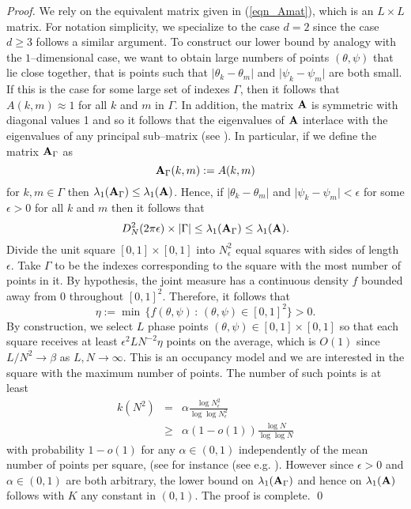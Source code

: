 \documentclass[smallextended]{svjour3}
\begin{document}
\begin{proof}
We rely on the equivalent matrix given in (\ref{eqn_Amat}), which is an $L \times L$ matrix. For notation simplicity, we specialize to the case $d=2$ since the case $d\geq 3$ follows a similar argument. To construct our lower bound by analogy with the $1$--dimensional case, we want to obtain large numbers of points $(\theta, \psi)$ that lie close together, that is points such that $\vert \theta_k - \theta_m \vert$ and $\vert \psi_k - \psi_m \vert$ are both small.  If this is the case for some large set of indexes $\Gamma$, then it follows that $A(k,m) \approx 1$ for all $k$ and $m$ in $\Gamma$. In addition, the matrix ${\bf A}$ is symmetric with diagonal values 1 and so it follows that the eigenvalues of ${\bf A}$ interlace with the eigenvalues of any principal sub--matrix (see \cite{Wilkinson}). In particular, if we define the matrix ${\bf A}_\Gamma$ as
$$
{\bf A}_\Gamma(k,m):= A(k,m)
$$
for $k,m\in \Gamma$ then $\lambda_1({\bf A}_\Gamma) \leq \lambda_1({\bf A})$. Hence, if 
${{\ensuremath{\lvert{{{\theta_k - \theta_m}}}\rvert}}}$ and ${{\ensuremath{\lvert{{{\psi_k-\psi_m}}}\rvert}}} < \epsilon$ for some $\epsilon>0$ for all $k$ and $m$ then it follows that 
$$
D_N^2(2 \pi \epsilon) \times \vert \Gamma \vert \leq \lambda_1({\bf A}_\Gamma) \leq \lambda_1({\bf A}).
$$
Divide the unit square $[0,1] \times [0,1]$ into $N^2_\epsilon$ equal squares with sides of length $\epsilon$. Take $\Gamma$ to be the indexes corresponding to the square with the most number of points in it. By hypothesis, the joint measure has a continuous density $f$ bounded away from 0 throughout $[0,1]^2$. Therefore, it follows that 
$$ 
\eta:=\min \,\{f(\theta,\psi)\,:\,(\theta,\psi)\in [0,1]^2\}>0.
$$
By construction, we select $L$ phase points $(\theta,\psi) \in [0,1]\times[0,1]$ so that each
square receives at least $\epsilon^2 L N^{-2} \eta$ points on the average, which is $O(1)$ since $L/N^2 \rightarrow \beta$ as $L,N \rightarrow \infty$. This is an occupancy model and we are interested in the square with the maximum number of points. The number of such points is at least
\begin{eqnarray*}
k(N^2) & = & \alpha \frac{ \log N_\epsilon^2}{ \log \log N_\epsilon^2} \\
       & \geq & \alpha (1 - o(1))\frac{\log N}{\log \log N}
\end{eqnarray*}
with probability $1- o(1)$ for any $\alpha \in (0,1)$ independently of the mean number of points
per square, (see for instance (see e.g. \cite{Raab}). However since $\epsilon > 0$ and $\alpha \in (0,1)$ are both arbitrary, the lower bound on $\lambda_1({\bf A}_\Gamma)$ and hence on $\lambda_1({\bf A})$ follows with $K$ any constant in $(0,1)$. The proof is complete.
\qed 
\end{proof}
\end{document}
